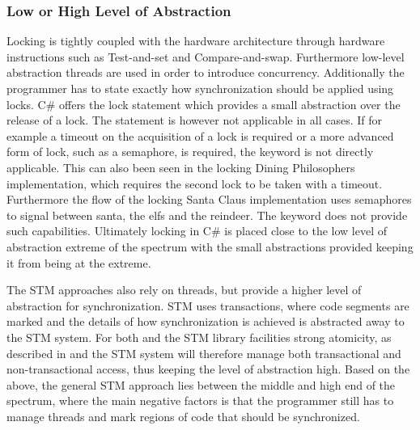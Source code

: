 \subsubsection{Low or High Level of Abstraction}\label{subsec:level_of_abstraction}
Locking is tightly coupled with the hardware architecture through hardware instructions such as Test-and-set and Compare-and-swap\cite[p. 1990]{scott2011sync}. Furthermore low-level abstraction threads are used in order to introduce concurrency. Additionally the programmer has to state exactly how synchronization should be applied using locks. C\# offers the lock  statement which provides a small abstraction over the release of a lock. The  statement is however not applicable in all cases. If for example a timeout on the acquisition of a lock is required or a more advanced form of lock, such as a semaphore, is required, the  keyword is not directly applicable. This can also been seen in the locking Dining Philosophers implementation, which requires the second lock to be taken with a timeout. Furthermore the flow of the locking Santa Claus implementation uses semaphores to signal between santa, the elfs and the reindeer. The  keyword does not provide such capabilities. Ultimately locking in C\# is placed close to the low level of abstraction extreme of the spectrum with the small abstractions provided keeping it from being at the extreme. 

The \ac{STM} approaches also rely on threads, but provide a higher level of abstraction for synchronization. \ac{STM} uses transactions, where code segments are marked and the details of how synchronization is achieved is abstracted away to the \ac{STM} system. For both \stmname and the \ac{STM} library facilities strong atomicity, as described in  and the \ac{STM} system will therefore manage both transactional and non-transactional access, thus keeping the level of abstraction high. Based on the above, the general \ac{STM} approach lies between the middle and high end of the spectrum, where the main negative factors is that the programmer still has to manage threads and mark regions of code that should be synchronized.

